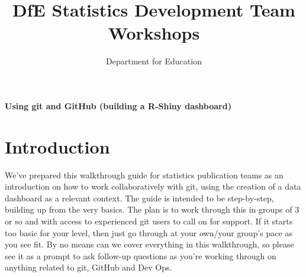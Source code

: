 \documentclass[
  12pt,
]{article}
\title{DfE Statistics Development Team Workshops}
\author{Department for Education}
\date{}
\begin{document}
\maketitle


\vspace*{0.24\textheight}

\raggedright{} 

\huge{\color{dfeheadingblue}\textbf{Using git and GitHub (building a R-Shiny dashboard)}}
\vspace*{2\baselineskip} 

\normalsize 
 \newpage 


{
\hypersetup{linkcolor=}
\setcounter{tocdepth}{2}
\tableofcontents
}
\newpage

\hypertarget{introduction}{%
\section{Introduction}\label{introduction}}

We've prepared this walkthrough guide for statistics publication teams
as an introduction on how to work collaboratively with git, using the
creation of a data dashboard as a relevant context. The guide is
intended to be step-by-step, building up from the very basics. The plan
is to work through this in groups of 3 or so and with access to
experienced git users to call on for support. If it starts too basic for
your level, then just go through at your own/your group's pace as you
see fit. By no means can we cover everything in this walkthrough, so
please see it as a prompt to ask follow-up questions as you're working
through on anything related to git, GitHub and Dev Ops.
\end{document}
